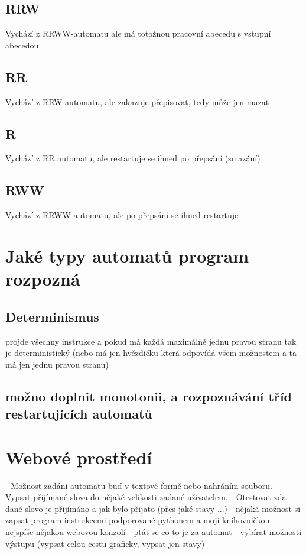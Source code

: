 \documentclass{article}
\begin{document}
	\subsection{RRW}
	Vychází z RRWW-automatu ale má totožnou pracovní abecedu s vstupní abecedou
	\subsection{RR}
	Vychází z RRW-automatu, ale zakazuje přepisovat, tedy může jen mazat
	\subsection{R}
	Vychází z RR automatu, ale restartuje se ihned po přepsání (smazání)
	\subsection{RWW}
	Vychází z RRWW automatu, ale po přepsání se ihned restartuje

\section{Jaké typy automatů program rozpozná}

	\subsection{Determinismus}
	projde všechny instrukce a pokud má každá maximálně jednu pravou stranu tak je deterministický (nebo má jen hvězdičku která odpovídá všem možnostem a ta má jen jednu pravou stranu)

	\subsection{možno doplnit monotonii, a rozpoznávání tříd restartujících automatů}
\section{Webové prostředí}
- Možnost zadání automatu buď v textové formě nebo nahráním souboru.
- Vypsat přijímané slova do nějaké velikosti zadané uživatelem.
- Otestovat zda dané slovo je přijímáno a jak bylo přijato (přes jaké stavy ...)
- nějaká možnost si zapsat program instrukcemi podporované pythonem a mojí knihovničkou
	- nejspíše nějakou webovou konzolí
- ptát se co to je za automat
- vybírat možnosti výstupu (vypsat celou cestu graficky, vypsat jen stavy)
\end{document}
